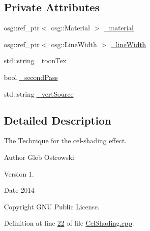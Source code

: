 \subsection*{Private Attributes}
\begin{DoxyCompactItemize}
\item 
osg\+::ref\+\_\+ptr$<$ osg\+::\+Material $>$ \hyperlink{classbrtr_1_1_cel_shading_technique_a266daa43a0effb4989755d61446dc14c}{\+\_\+material}
\item 
osg\+::ref\+\_\+ptr$<$ osg\+::\+Line\+Width $>$ \hyperlink{classbrtr_1_1_cel_shading_technique_a2b943ddfe4db5a92b959217a8321584f}{\+\_\+line\+Width}
\item 
std\+::string \hyperlink{classbrtr_1_1_cel_shading_technique_aca9e9164e2ccb2ce264786399713a8a6}{\+\_\+toon\+Tex}
\item 
bool \hyperlink{classbrtr_1_1_cel_shading_technique_a096109e6280cd43bb55762509a3e9f0c}{\+\_\+second\+Pass}
\item 
std\+::string \hyperlink{classbrtr_1_1_cel_shading_technique_a52a36916162a24d0ddd66d371fa04057}{\+\_\+vert\+Source}
\end{DoxyCompactItemize}


\subsection{Detailed Description}
The Technique for the cel-\/shading effect. 

\begin{DoxyAuthor}{Author}
Gleb Ostrowski 
\end{DoxyAuthor}
\begin{DoxyVersion}{Version}
1. 
\end{DoxyVersion}
\begin{DoxyDate}{Date}
2014 
\end{DoxyDate}
\begin{DoxyCopyright}{Copyright}
G\+N\+U Public License. 
\end{DoxyCopyright}


Definition at line \hyperlink{_cel_shading_8cpp_source_l00022}{22} of file \hyperlink{_cel_shading_8cpp_source}{Cel\+Shading.\+cpp}.



